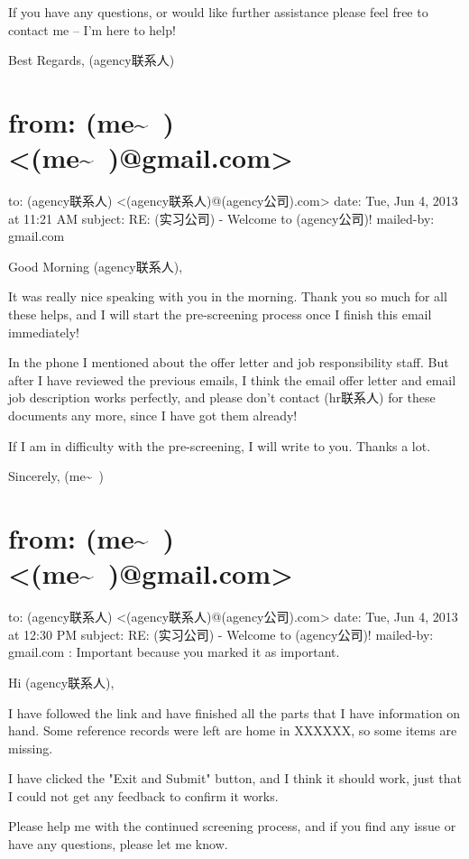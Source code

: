 \documentclass[12pt]{book}
\begin{document}
If you have any questions, or would like further assistance please feel free to contact me -- I'm here to help!

Best Regards,
(agency联系人)


\section{from:         (me\textasciitilde{}~) <(me\textasciitilde{}~)@gmail.com>}
\label{sec-39-8}
to:         (agency联系人) <(agency联系人)@(agency公司).com>
date:         Tue, Jun 4, 2013 at 11:21 AM
subject:         RE: (实习公司) - Welcome to (agency公司)!
mailed-by:         gmail.com

Good Morning (agency联系人),

It was really nice speaking with you in the morning. Thank you so much for all these helps, and I will start the pre-screening process once I finish this email immediately!

In the phone I mentioned about the offer letter and job responsibility staff. But after I have reviewed the previous emails, I think the email offer letter and email job description works perfectly, and please don't contact (hr联系人) for these documents any more, since I have got them already!

If I am in difficulty with the pre-screening, I will write to you.
Thanks a lot.

Sincerely,
(me\textasciitilde{}~)


\section{from:         (me\textasciitilde{}~) <(me\textasciitilde{}~)@gmail.com>}
\label{sec-39-9}
to:         (agency联系人) <(agency联系人)@(agency公司).com>
date:         Tue, Jun 4, 2013 at 12:30 PM
subject:         RE: (实习公司) - Welcome to (agency公司)!
mailed-by:         gmail.com
:         Important because you marked it as important.

Hi (agency联系人),

I have followed the link and have finished all the parts that I have information on hand. Some reference records were left are home in XXXXXX, so some items are missing.

I have clicked the "Exit and Submit" button, and I think it should work, just that I could not get any feedback to confirm it works.

Please help me with the continued screening process, and if you find any issue or have any questions, please let me know.
\end{document}
